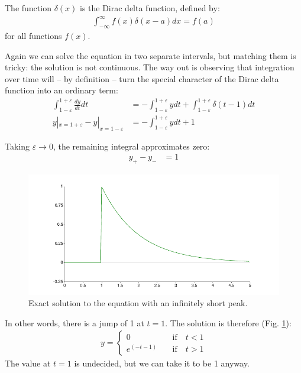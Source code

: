 \documentclass[onecolumn]{article}
\begin{document}
The function $\delta(x)$ is the Dirac delta function, defined by:
%
\begin{align}
    \int_{-\infty}^\infty f(x) \delta(x-a) dx = f(a)
\end{align}
\noindent for all functions $f(x)$.

Again we can solve the equation in two separate intervals, but matching them is tricky: the solution
is not continuous. The way out is observing that integration over time will -- by definition -- turn the
special character of the Dirac delta function into an ordinary term:
%
\begin{align}
            \int_{1-\varepsilon}^{1+\varepsilon} \frac{dy}{dt} dt &=  - \int_{1-\varepsilon}^{1+\varepsilon} y dt + \int_{1-\varepsilon}^{1+\varepsilon} \delta(t-1) dt \\
\nonumber         y|_{x=1+\varepsilon} - y|_{x=1-\varepsilon}     &=  - \int_{1-\varepsilon}^{1+\varepsilon} y dt + 1
\end{align}

Taking $\varepsilon \rightarrow 0$, the remaining integral approximates zero:
\begin{align}
          y_+ - y_-  &=  1
\end{align}

\begin{figure}
\begin{center}
\includegraphics{jumpexact2.pdf}
\caption{Exact solution to the equation with an infinitely short peak.}
\label{solutionShort}
\end{center}
\end{figure}

In other words, there is a jump of 1 at $t = 1$. The solution is therefore (Fig. \ref{solutionShort}):
%
\begin{align}
           y =
           \begin{cases}
                 0          & \quad \text{if} \quad t < 1 \\
                 e^{(-t-1)} & \quad \text{if} \quad t > 1
           \end{cases}
\end{align}
The value at $t = 1$ is undecided, but we can take it to be 1 anyway.
\end{document}
